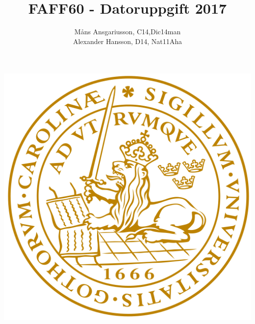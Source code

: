 \documentclass{article}
\begin{document}
\title{FAFF60 - Datoruppgift 2017}
\author{Måns Ansgariusson, C14,Dic14man\\ Alexander Hansson, D14, Nat11Aha}
\maketitle
\centerline{\includegraphics[width=\textwidth]{LTH.png}}
\newpage
\end{document}
